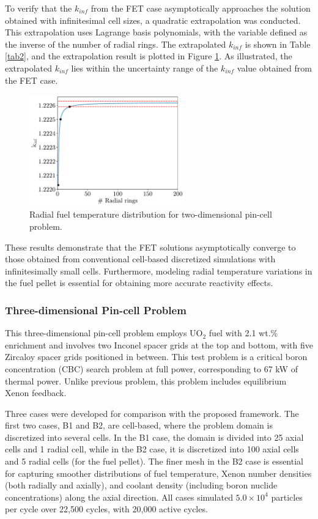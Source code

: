 To verify that the $k_{inf}$ from the FET case asymptotically approaches the solution obtained with infinitesimal cell sizes, a quadratic extrapolation was conducted. This extrapolation uses Lagrange basis polynomials, with the variable defined as the inverse of the number of radial rings. The extrapolated $k_{inf}$ is shown in Table \ref{tab2}, and the extrapolation result is plotted in Figure \ref{fig_43}. As illustrated, the extrapolated $k_{inf}$ lies within the uncertainty range of the $k_{inf}$ value obtained from the FET case.
\begin{figure}
    \centering
    \includegraphics[width=0.6\textwidth]{figs/k_inf.pdf}
    \caption{Radial fuel temperature distribution for two-dimensional pin-cell problem.}
    \label{fig_43}
\end{figure}

These results demonstrate that the FET solutions asymptotically converge to those obtained from conventional cell-based discretized simulations with infinitesimally small cells. Furthermore, modeling radial temperature variations in the fuel pellet is essential for obtaining more accurate reactivity effects.

\subsubsection{Three-dimensional Pin-cell Problem}

This three-dimensional pin-cell problem employs UO$_2$ fuel with 2.1 wt.\% enrichment and involves two Inconel spacer grids at the top and bottom, with five Zircaloy spacer grids positioned in between. This test problem is a critical boron concentration (CBC) search problem at full power, corresponding to 67 kW of thermal power. Unlike previous problem, this problem includes equilibrium Xenon feedback.

Three cases were developed for comparison with the proposed framework. The first two cases, B1 and B2, are cell-based, where the problem domain is discretized into several cells. In the B1 case, the domain is divided into 25 axial cells and 1 radial cell, while in the B2 case, it is discretized into 100 axial cells and 5 radial cells (for the fuel pellet). The finer mesh in the B2 case is essential for capturing smoother distributions of fuel temperature, Xenon number densities (both radially and axially), and coolant density (including boron nuclide concentrations) along the axial direction. All cases simulated $5.0\times10^4$ particles per cycle over 22,500 cycles, with 20,000 active cycles.


